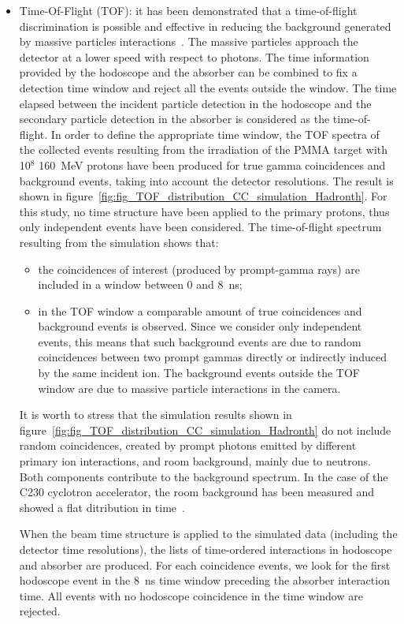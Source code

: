 \begin{itemize}
\item Time-Of-Flight (TOF): it has been demonstrated that a time-of-flight discrimination is possible and effective in reducing the background generated by massive particles interactions~\cite{Testa:2010aa}. The massive particles approach the detector at a lower speed with respect to photons. The time information provided by the hodoscope and the absorber can be combined to fix a detection time window and reject all the events outside the window. The time elapsed between the incident particle detection in the hodoscope and the secondary particle detection in the absorber is considered as the time-of-flight. In order to define the appropriate time window, the TOF spectra of the collected events resulting from the irradiation of the PMMA target with 10$^{8}$ 160~MeV protons have been produced for true gamma coincidences and background events, taking into account the detector resolutions. The result is shown in figure~\ref{fig:fig_TOF_distribution_CC_simulation_Hadronth}. For this study, no time structure have been applied to the primary protons, thus only independent events have been considered. The time-of-flight spectrum resulting from the simulation shows that:
\begin{itemize}
\item the coincidences of interest (produced by prompt-gamma rays) are included in a window between 0 and 8~ns;
\item in the TOF window a comparable amount of true coincidences and background events is observed. Since we consider only independent events, this means that such background events are due to random coincidences between two prompt gammas directly or indirectly induced by the same incident ion. The background events outside the TOF window are due to massive particle interactions in the camera.
\end{itemize}
It is worth to stress that the simulation results shown in figure~\ref{fig:fig_TOF_distribution_CC_simulation_Hadronth} do not include random coincidences, created by prompt photons emitted by different primary ion interactions, and room background, mainly due to neutrons. Both components contribute to the background spectrum. In the case of the C230 cyclotron accelerator, the room background has been measured and showed a flat ditribution in time~\cite{Pinto2014}.

When the beam time structure is applied to the simulated data (including the detector time resolutions), the lists of time-ordered interactions in hodoscope and absorber are produced. For each coincidence events, we look for the first hodoscope event in the 8~ns time window preceding the absorber interaction time. All events with no hodoscope coincidence in the time window are rejected.


\end{itemize}
